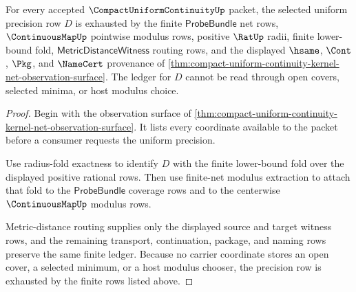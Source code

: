 \begin{theorem}
\label{thm:compact-uniform-continuity-modulus-ledger-exhaustion}
For every accepted $\CompactUniformContinuityUp$ packet, the selected uniform precision row $D$ is exhausted by the finite $\mathsf{ProbeBundle}$ net rows, $\ContinuousMapUp$ pointwise modulus rows, positive $\RatUp$ radii, finite lower-bound fold, $\mathsf{MetricDistanceWitness}$ routing rows, and the displayed $\hsame$, $\Cont$, $\Pkg$, and $\NameCert$ provenance of \autoref{thm:compact-uniform-continuity-kernel-net-observation-surface}. The ledger for $D$ cannot be read through open covers, selected minima, or host modulus choice.
\end{theorem}
\begin{proof}
Begin with the observation surface of \autoref{thm:compact-uniform-continuity-kernel-net-observation-surface}. It lists every coordinate available to the packet before a consumer requests the uniform precision.

Use radius-fold exactness to identify $D$ with the finite lower-bound fold over the displayed positive rational rows. Then use finite-net modulus extraction to attach that fold to the $\mathsf{ProbeBundle}$ coverage rows and to the centerwise $\ContinuousMapUp$ modulus rows.

Metric-distance routing supplies only the displayed source and target witness rows, and the remaining transport, continuation, package, and naming rows preserve the same finite ledger. Because no carrier coordinate stores an open cover, a selected minimum, or a host modulus chooser, the precision row is exhausted by the finite rows listed above.
\end{proof}

